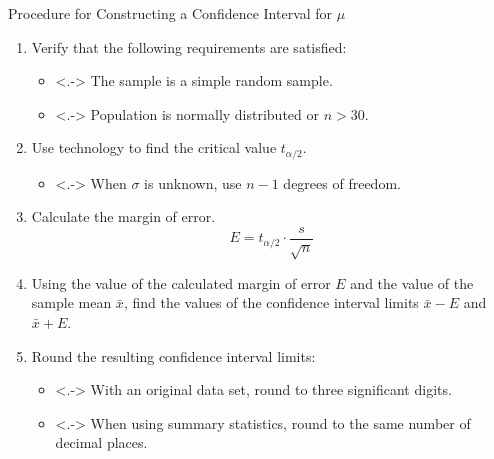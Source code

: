 \documentclass{beamer}
\begin{document}
\begin{frame}
\begin{block}{Procedure for Constructing a Confidence Interval for $\mu$}
\begin{enumerate}[<+- | alert@+>]
\item Verify that the following requirements are satisfied:
\begin{itemize}
\item<.-> The sample is a simple random sample.
\item<.-> Population is normally distributed or $n>30$.
\end{itemize}
\item Use technology to find the critical value $t_{\alpha/2}$.
\begin{itemize}
\item<.-> When $\sigma$ is unknown, use $n-1$ degrees of freedom.
\end{itemize}
\item Calculate the margin of error.
\begin{equation*}
E=t_{\alpha/2}\cdot\dfrac{s}{\sqrt{n}}
\end{equation*}
\item Using the value of the calculated margin of error $E$ and the value of the sample mean $\bar{x}$, find the values of the confidence interval limits $\bar{x}-E$ and $\bar{x}+E$.
\item Round the resulting confidence interval limits:
\begin{itemize}
\item<.-> With an original data set, round to three significant digits.
\item<.-> When using summary statistics, round to the same number of decimal places.
\end{itemize}
\end{enumerate}
\end{block}
\end{frame}
\end{document}
